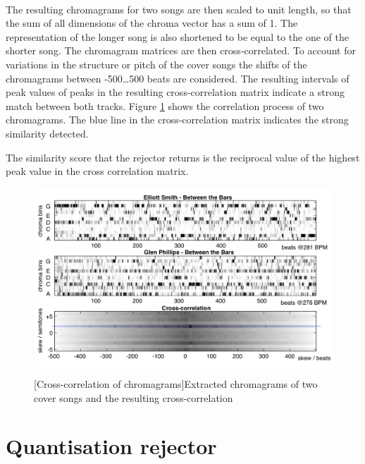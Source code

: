 \paragraph{}
The resulting chromagrams for two songs are then scaled to unit length, so that
the sum of all dimensions of the chroma vector has a sum of 1. The
representation of the longer song is also shortened to be equal to the one of
the shorter song. The chromagram matrices are then cross-correlated. To account
for variations in the structure or pitch of the cover songs the shifts of the
chromagrams between -500\dots500 beats are considered. The resulting intervals
of peak values of peaks in the resulting cross-correlation matrix indicate a
strong match between both tracks. Figure \ref{fig:cross-correlation} shows the
correlation process of two chromagrams. The blue line in the cross-correlation
matrix indicates the strong similarity detected.

The similarity score that the rejector returns is the reciprocal value of the
highest peak value in the cross correlation matrix.

\begin{figure}
    \centering
    \includegraphics[width=\textwidth]{Algorithms/cross-correlation.png}
    [Cross-correlation of chromagrams]{Extracted chromagrams of two cover songs and the resulting cross-correlation \cite{ellis2007identifyingcover}}
    \label{fig:cross-correlation}
\end{figure}

\section{Quantisation rejector}
\label{sec:ccs}

